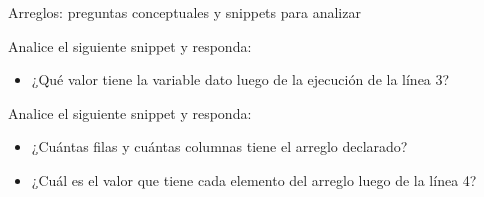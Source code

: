 \documentclass[xcolor=pdftex,table,11pt]{beamer}
\begin{document}
\begin{frame}[allowframebreaks]{Arreglos: preguntas conceptuales y snippets para analizar}
\newpage

Analice el siguiente snippet y responda:

\codesetstylefrombeamer
{}


\begin{itemize}

\item ¿Qué valor tiene la variable dato luego de la ejecución de la línea 3?


\end{itemize}


\newpage

Analice el siguiente snippet y responda:

\codesetstylefrombeamer
{}


\begin{itemize}

\item ¿Cuántas filas y cuántas columnas tiene el arreglo declarado?

\item ¿Cuál es el valor que tiene cada elemento del arreglo luego de la línea 4?


\end{itemize}

\end{frame}
\end{document}
